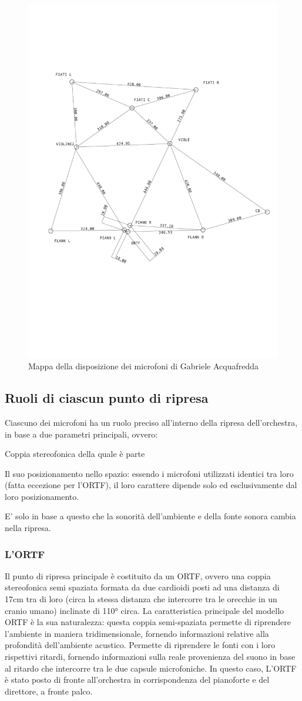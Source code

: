 \begin{figure}[t]
	\centering
	\includegraphics[width=.47\textwidth]{img/image2.jpg}
	\caption{Mappa della disposizione dei microfoni di Gabriele Acquafredda}
	\label{gs}
\end{figure}

\subsection*{Ruoli di ciascun punto di ripresa}
Ciascuno dei microfoni ha un ruolo preciso all'interno della ripresa dell'orchestra, in base a due parametri principali, ovvero:
\begin{compactitem}
\item Coppia stereofonica della quale è parte
\item Il suo posizionamento nello spazio: essendo i microfoni utilizzati identici tra loro (fatta eccezione per l'ORTF), il loro carattere dipende solo ed esclusivamente dal loro posizionamento.
\end{compactitem}
E' solo in base a questo che la sonorità dell'ambiente e della fonte sonora cambia nella ripresa.

\subsubsection*{L'ORTF}
Il punto di ripresa principale è costituito da un ORTF, ovvero una coppia stereofonica semi spaziata formata da due cardioidi posti ad una distanza di 17cm tra di loro (circa la stessa distanza che intercorre tra le orecchie in un cranio umano) inclinate di 110° circa.
La caratteristica principale del modello ORTF è la sua naturalezza: questa coppia semi-spaziata permette di riprendere l'ambiente in maniera tridimensionale, fornendo informazioni relative alla profondità dell'ambiente acustico. Permette di riprendere le fonti con i loro rispettivi ritardi, fornendo informazioni sulla reale provenienza del suono in base al ritardo che intercorre tra le due capsule microfoniche.
In questo caso, L'ORTF è stato posto di fronte all'orchestra in corrispondenza del pianoforte e del direttore, a fronte palco.

